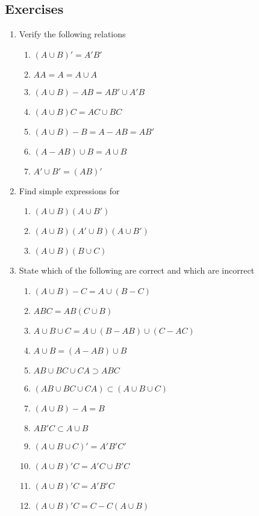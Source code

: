 \documentclass[../main.tex]{subfiles}
\begin{document}
{\fontsize{10}{10}\selectfont
\subsection{Exercises}
\begin{enumerate}
	\item Verify the following relations
	\begin{enumerate}
		\item $(A \cup B)' = A'B'$
		\item $AA = A = A \cup A$
		\item $(A \cup B) - AB = AB' \cup A'B$
		\item $(A \cup B)C = AC \cup BC$
		\item $(A \cup B) - B = A - AB = AB'$
		\item $(A - AB) \cup B = A \cup B$
		\item $A' \cup B' = (AB)'$
	\end{enumerate}

	\item Find simple expressions for
	\begin{enumerate}
		\item $(A \cup B)(A \cup B')$
		\item $(A \cup B)(A' \cup B)(A \cup B')$
		\item $(A \cup B)(B \cup C)$
	\end{enumerate}

	\item State which of the following are correct and which
	are incorrect
	\begin{enumerate}
		\item $(A \cup B) - C = A \cup (B-C)$
		\item $ABC = AB(C \cup B)$
		\item $A \cup B \cup C = A \cup (B-AB) \cup (C-AC)$
		\item $A \cup B = (A-AB) \cup B$
		\item $AB \cup BC \cup CA \supset ABC$
		\item $(AB \cup BC \cup CA) \subset (A \cup B \cup C)$
		\item $(A \cup B) - A = B$
		\item $AB'C \subset A \cup B$
		\item $(A \cup B \cup C)' = A'B'C'$
		\item $(A \cup B)'C = A'C \cup B'C$
		\item $(A \cup B)'C = A'B'C$
		\item $(A \cup B)'C = C - C(A \cup B)$
	\end{enumerate}


\end{enumerate}}
\end{document}
